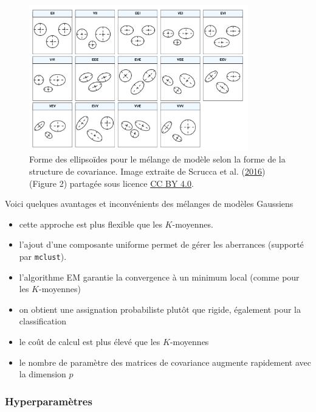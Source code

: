 \documentclass[
  11pt,
  letterpaper,
]{scrbook}
\providecommand{\tightlist}{%
  \setlength{\itemsep}{0pt}\setlength{\parskip}{0pt}}\usepackage{longtable,booktabs,array}
\theoremstyle{definition}
\theoremstyle{remark}
\begin{document}
\begin{figure}[ht!]

{\centering \includegraphics[width=0.85\textwidth,height=\textheight]{figures/mclust5-parametrization.png}

}

\caption{\label{fig-modeles}Forme des ellipsoïdes pour le mélange de
modèle selon la forme de la structure de covariance. Image extraite de
Scrucca et al. (\protect\hyperlink{ref-mclust5}{2016}) (Figure 2)
partagée sous licence
\href{https://creativecommons.org/licenses/by/4.0/}{CC BY 4.0}.}

\end{figure}

Voici quelques avantages et inconvénients des mélanges de modèles
Gaussiens

\begin{itemize}
\tightlist
\item
  cette approche est plus flexible que les \(K\)-moyennes.
\item
  l'ajout d'une composante uniforme permet de gérer les aberrances
  (supporté par \texttt{mclust}).
\item
  l'algorithme EM garantie la convergence à un minimum local (comme pour
  les \(K\)-moyennes)
\item
  on obtient une assignation probabiliste plutôt que rigide, également
  pour la classification
\item
  le coût de calcul est plus élevé que les \(K\)-moyennes
\item
  le nombre de paramètre des matrices de covariance augmente rapidement
  avec la dimension \(p\)
\end{itemize}

\hypertarget{hyperparamuxe8tres}{%
\subsubsection{Hyperparamètres}\label{hyperparamuxe8tres}}
\end{document}
